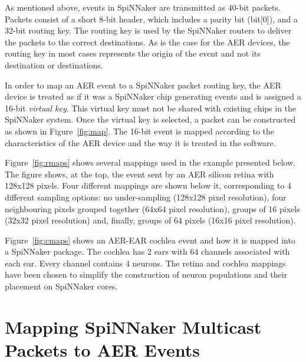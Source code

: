 

As mentioned above, events in SpiNNaker are transmitted as 40-bit
packets. Packets consist of a short 8-bit header, which includes a
parity bit (bit[0]), and a 32-bit routing key. The routing key is used
by the SpiNNaker routers to deliver the packets to the correct
destinations. As is the case for the AER devices, the routing key in
most cases represents the origin of the event and not its destination
or destinations.

In order to map an AER event to a SpiNNaker packet routing key, the
AER device is treated as if it was a SpiNNaker chip generating events
and is assigned a 16-bit \emph{virtual key}. This virtual key must not be
shared with existing chips in the SpiNNaker system. Once the virtual
key is selected, a packet can be constructed as shown in
Figure~\ref{fig:map}. The 16-bit event is mapped according to the
characteristics of the AER device and the way it is treated in the
software.\\




Figure~\ref{fig:rmaps} shows several mappings used in the example
presented below.  The figure shows, at the top, the event sent by an
AER silicon retina with 128x128 pixels. Four different mappings are
shown below it, corresponding to 4 different sampling options: no
under-sampling (128x128 pixel resolution), four neighbouring pixels
grouped together (64x64 pixel resolution), groups of 16 pixels (32x32
pixel resolution) and, finally, groups of 64 pixels (16x16 pixel
resolution).\\




Figure~\ref{fig:cmaps} shows an AER-EAR cochlea event and how it is
mapped into a SpiNNaker package. The cochlea has 2 ears with 64
channels associated with each ear. Every channel contains 4
neurons. The retina and cochlea mappings have been chosen to simplify
the construction of neuron populations and their placement on
SpiNNaker cores.



\section{Mapping SpiNNaker Multicast Packets to AER Events}


